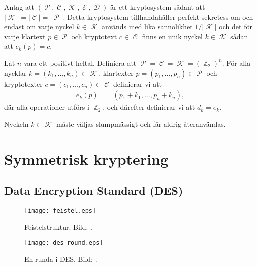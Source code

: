 \documentclass{beamer}
\theoremstyle{definition}
\DeclareMathOperator{\p}{\mathcal{P}}
\let\P\p
\DeclareMathOperator{\C}{\mathcal{C}}
\DeclareMathOperator{\K}{\mathcal{K}}
\DeclareMathOperator{\E}{\mathcal{E}}
\DeclareMathOperator{\D}{\mathcal{D}}
\DeclareMathOperator{\Z}{\mathbb{Z}}
\let\stoch\mathbf
\renewcommand{\p}{\stoch P}
\begin{document}
\begin{frame}{\insertsubsectionhead}
  \begin{theorem}\label{thm:perfectSecrecy}
    Antag att \((\P, \C, \K, \E, \D)\) är ett kryptosystem sådant att \(|\K| 
    = |\C| = |\P|\).
    Detta kryptosystem tillhandahåller perfekt sekretess om och endast om
    varje nyckel \(k\in \K\) används med lika sannolikhet \(1/|\K|\) och det 
    för varje klartext \(p\in \P\) och kryptotext \(c\in \C\) finns en unik 
    nyckel \(k\in \K\) sådan att \(e_k(p) = c\).
  \end{theorem}
\end{frame}

\begin{frame}{\insertsubsectionhead}
  \begin{definition}
    Låt \(n\) vara ett positivt heltal.
    Definiera att \(\P = \C = \K = (\Z_2)^n\).
    För alla nycklar \(k = (k_1,\ldots,k_n)\in \K\), klartexter \(p = (p_1, 
    \ldots, p_n)\in \P\) och kryptotexter \(c = (c_1,\ldots,c_n)\in \C\) 
    definierar vi att
    \begin{align}
      \nonumber
      e_k(p) &= (p_1 + k_1, \ldots, p_n + k_n),
    \end{align}
    där alla operationer utförs i \(\Z_2\), och därefter definierar vi att 
    \(d_k = e_k\).

    Nyckeln \(k\in \K\) måste väljas slumpmässigt och får aldrig återanvändas.
  \end{definition}
\end{frame}


\section{Symmetrisk kryptering}

\subsection{Data Encryption Standard (DES)}

\begin{frame}{\insertsubsectionhead}
  \begin{figure}
    \texttt{[image: feistel.eps]}
    \caption{Feistelstruktur.
    Bild: \cite{Stallings2011can}.}
  \end{figure}
\end{frame}

\begin{frame}{\insertsubsectionhead}
  \begin{figure}
    \texttt{[image: des-round.eps]}
    \caption{En runda i DES.
    Bild: \cite{Stallings2011can}.}
  \end{figure}
\end{frame}
\end{document}
